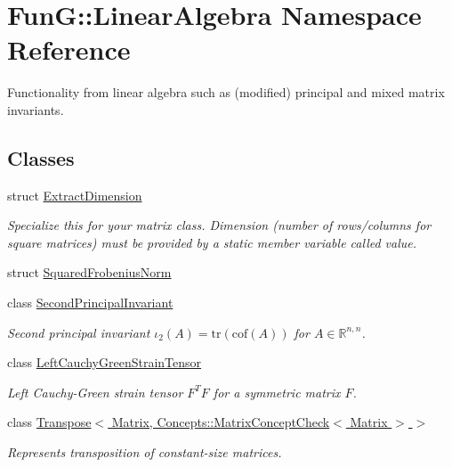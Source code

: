 \hypertarget{namespaceFunG_1_1LinearAlgebra}{\section{\-Fun\-G\-:\-:\-Linear\-Algebra \-Namespace \-Reference}
\label{namespaceFunG_1_1LinearAlgebra}
}


\-Functionality from linear algebra such as (modified) principal and mixed matrix invariants.  


\subsection*{\-Classes}
\begin{DoxyCompactItemize}
\item 
struct \hyperlink{structFunG_1_1LinearAlgebra_1_1ExtractDimension}{\-Extract\-Dimension}
\begin{DoxyCompactList}\small\item\em \-Specialize this for your matrix class. \-Dimension (number of rows/columns for square matrices) must be provided by a static member variable called value. \end{DoxyCompactList}\item 
struct \hyperlink{structFunG_1_1LinearAlgebra_1_1SquaredFrobeniusNorm}{\-Squared\-Frobenius\-Norm}
\item 
class \hyperlink{classFunG_1_1LinearAlgebra_1_1SecondPrincipalInvariant}{\-Second\-Principal\-Invariant}
\begin{DoxyCompactList}\small\item\em \-Second principal invariant $ \iota_2(A)=\mathrm{tr}(\mathrm{cof}(A)) $ for $A\in\mathbb{R}^{n,n}$. \end{DoxyCompactList}\item 
class \hyperlink{classFunG_1_1LinearAlgebra_1_1LeftCauchyGreenStrainTensor}{\-Left\-Cauchy\-Green\-Strain\-Tensor}
\begin{DoxyCompactList}\small\item\em \-Left \-Cauchy-\/\-Green strain tensor $ F^T F $ for a symmetric matrix $ F $. \end{DoxyCompactList}\item 
class \hyperlink{classFunG_1_1LinearAlgebra_1_1Transpose_3_01Matrix_00_01Concepts_1_1MatrixConceptCheck_3_01Matrix_01_4_01_4}{\-Transpose$<$ Matrix, Concepts\-::\-Matrix\-Concept\-Check$<$ Matrix $>$ $>$}
\begin{DoxyCompactList}\small\item\em \-Represents transposition of constant-\/size matrices. \end{DoxyCompactList}\item 

\end{DoxyCompactItemize}
